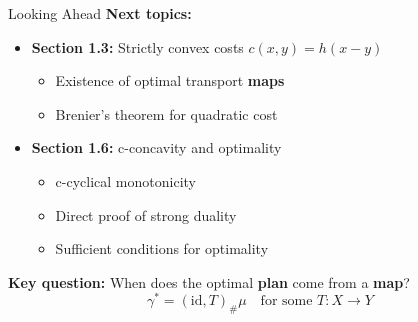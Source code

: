 \documentclass[aspectratio=169]{beamer}
\begin{document}
\begin{frame}{Looking Ahead}
\textbf{Next topics:}

\vspace{0.3cm}
\begin{itemize}
    \item \textbf{Section 1.3:} Strictly convex costs $c(x,y) = h(x-y)$
    \begin{itemize}
        \item Existence of optimal transport \textbf{maps}
        \item Brenier's theorem for quadratic cost
    \end{itemize}

    \vspace{0.3cm}
    \item \textbf{Section 1.6:} c-concavity and optimality
    \begin{itemize}
        \item c-cyclical monotonicity
        \item Direct proof of strong duality
        \item Sufficient conditions for optimality
    \end{itemize}
\end{itemize}

\vspace{0.4cm}
\textbf{Key question:} When does the optimal \textbf{plan} come from a \textbf{map}?
\[
\gamma^* = (\text{id}, T)_\# \mu \quad \text{for some } T: X \to Y
\]
\end{frame}
\end{document}
